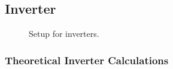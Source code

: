 \documentclass{article}
\begin{document}
\subsection{Inverter}
\begin{figure}[H]
\centering
{}
\caption{Setup for inverters.}
\end{figure}

\subsubsection{Theoretical Inverter Calculations}
\end{document}
